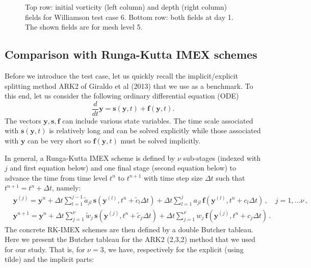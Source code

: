 \documentclass[a4paper, 12pt]{article}
\begin{document}
\begin{figure}[t]
\begin{tabular}{cc}
 \end{tabular}\vspace{-10pt}
  \caption{Top row: initial vorticity (left column) and depth (right column) fields
  for Williamson test case 6. Bottom row: both fields at day 1. The shown fields are for mesh level 5.
  }
 \label{tc6_fields}
\end{figure}



\subsection{Comparison with Runga-Kutta IMEX schemes}

\newcommand{\ybf}{\mathbf{y}}
\newcommand{\sbf}{\mathbf{s}}
\newcommand{\fbf}{\mathbf{f}}

Before we introduce the test case, let us quickly recall the implicit/explicit
splitting method ARK2 of Giraldo et al (2013) that we use as a benchmark.
To this end, let us consider the following ordinary differential equation (ODE)
\begin{equation}
\frac{d}{dt} \mathbf{y} = \mathbf{s}(\mathbf{y}, t) + \mathbf{f} (\mathbf {y}, t).
\end{equation}
The vectors $\mathbf{y}, \mathbf{s} , \mathbf{f}$ can include various state variables.
The time scale associated with $ \mathbf{s}(\mathbf{y}, t)$ is relatively long
and can be solved explicitly while those associated with $\mathbf {y}$
can be very short so $ \mathbf{f} (\mathbf {y}, t)$ must be solved implicitly.

In general, a Runga-Kutta IMEX scheme is defined by $\nu$ sub-stages (indexed with $j$ and first equation below) and one final stage (second equation below) to advance the time from time level $t^n$ to $t^{n+1}$ with time step size $\Delta t$ such that
$t^{n+1} = t^n + \Delta t$, namely:
\begin{align}
&  \ybf^{(j)}  = \ybf^n + \Delta t \sum_{l=1}^{j-1} \tilde a_{jl} \,  \sbf(\ybf^{(l)}, t^n + \tilde c_{l}\Delta t) + \Delta t \sum_{l=1}^{j} a_{jl} \,  \fbf(\ybf^{(l)}, t^n + c_{l}\Delta t) \, ,  \quad j = 1,...\nu \, , \\
&  \ybf^{n+1}  = \ybf^n + \Delta t \sum_{j=1}^{\nu} \tilde w_{j} \,  \sbf(\ybf^{(j)}, t^n + \tilde c_{j}\Delta t) + \Delta t \sum_{j=1}^{\nu} w_{j} \,  \fbf(\ybf^{(j)}, t^n + c_{j}\Delta t) \, .
\end{align}
The concrete RK-IMEX schemes are then defined by a double Butcher tableau. Here we present the Butcher tableau for the ARK2 (2,3,2) method that we used for our study. That is, for $\nu = 3$, we have, respectively for the explicit (using tilde) and the implicit parts:
\end{document}
